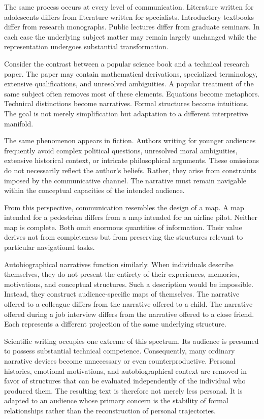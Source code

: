 \documentclass[11pt]{article}
\theoremstyle{plain}
\begin{document}
The same process occurs at every level of communication. Literature written for adolescents differs from literature written for specialists. Introductory textbooks differ from research monographs. Public lectures differ from graduate seminars. In each case the underlying subject matter may remain largely unchanged while the representation undergoes substantial transformation.

Consider the contrast between a popular science book and a technical research paper. The paper may contain mathematical derivations, specialized terminology, extensive qualifications, and unresolved ambiguities. A popular treatment of the same subject often removes most of these elements. Equations become metaphors. Technical distinctions become narratives. Formal structures become intuitions. The goal is not merely simplification but adaptation to a different interpretive manifold.

The same phenomenon appears in fiction. Authors writing for younger audiences frequently avoid complex political questions, unresolved moral ambiguities, extensive historical context, or intricate philosophical arguments. These omissions do not necessarily reflect the author's beliefs. Rather, they arise from constraints imposed by the communicative channel. The narrative must remain navigable within the conceptual capacities of the intended audience.

From this perspective, communication resembles the design of a map. A map intended for a pedestrian differs from a map intended for an airline pilot. Neither map is complete. Both omit enormous quantities of information. Their value derives not from completeness but from preserving the structures relevant to particular navigational tasks.

Autobiographical narratives function similarly. When individuals describe themselves, they do not present the entirety of their experiences, memories, motivations, and conceptual structures. Such a description would be impossible. Instead, they construct audience-specific maps of themselves. The narrative offered to a colleague differs from the narrative offered to a child. The narrative offered during a job interview differs from the narrative offered to a close friend. Each represents a different projection of the same underlying structure.

Scientific writing occupies one extreme of this spectrum. Its audience is presumed to possess substantial technical competence. Consequently, many ordinary narrative devices become unnecessary or even counterproductive. Personal histories, emotional motivations, and autobiographical context are removed in favor of structures that can be evaluated independently of the individual who produced them. The resulting text is therefore not merely less personal. It is adapted to an audience whose primary concern is the stability of formal relationships rather than the reconstruction of personal trajectories.
\end{document}

